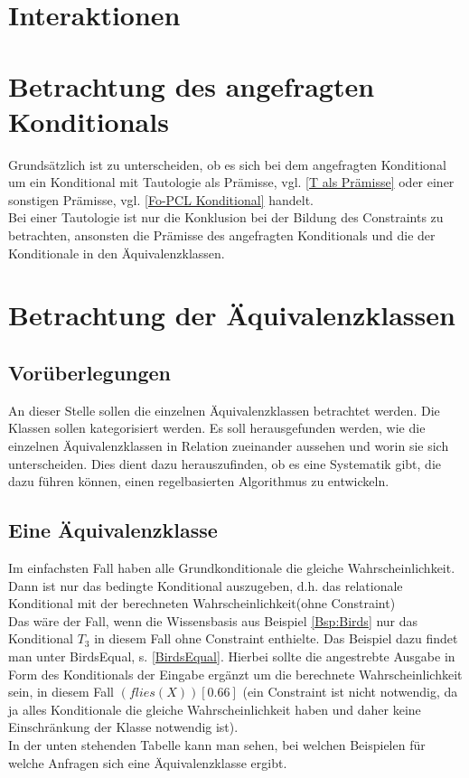 \documentclass[a4paper, 11pt]{book}
\begin{document}
\section{Interaktionen}

\section{Betrachtung des angefragten Konditionals}
Grundsätzlich ist zu unterscheiden, ob es sich bei dem angefragten Konditional um ein Konditional mit Tautologie als Prämisse, vgl. \ref{T als Prämisse} oder einer sonstigen Prämisse, vgl. \ref{Fo-PCL Konditional} handelt.\\
Bei einer Tautologie ist nur die Konklusion bei der Bildung des Constraints zu betrachten, ansonsten die Prämisse des angefragten Konditionals und die der Konditionale in den Äquivalenzklassen.


\section{Betrachtung der Äquivalenzklassen}
\subsection{Vorüberlegungen}
An dieser Stelle sollen die einzelnen Äquivalenzklassen betrachtet werden. Die Klassen sollen kategorisiert werden. Es soll herausgefunden werden, wie die einzelnen Äquivalenzklassen in Relation zueinander aussehen und worin sie sich unterscheiden. Dies dient dazu herauszufinden, ob es eine Systematik gibt, die dazu führen können, einen regelbasierten Algorithmus zu entwickeln. 
\label{Eine Äquivalenzklasse}
\subsection{Eine Äquivalenzklasse}
Im einfachsten Fall haben alle Grundkonditionale die gleiche Wahrscheinlichkeit. Dann ist nur das bedingte Konditional auszugeben, d.h. das relationale Konditional mit der berechneten Wahrscheinlichkeit(ohne Constraint)\\
Das wäre der Fall, wenn die Wissensbasis aus Beispiel \ref{Bsp:Birds} nur das Konditional $ T_3 $ in diesem Fall ohne Constraint enthielte. Das Beispiel dazu findet man unter BirdsEqual, s. \ref{BirdsEqual}. Hierbei sollte die angestrebte Ausgabe  in Form des Konditionals der Eingabe ergänzt um die berechnete Wahrscheinlichkeit sein, in diesem Fall $ (flies(X)) [0.66]$ (ein Constraint ist nicht notwendig, da ja alles Konditionale die gleiche Wahrscheinlichkeit haben und daher keine Einschränkung der Klasse notwendig ist).\\
In der unten stehenden Tabelle kann man sehen, bei welchen Beispielen für welche Anfragen sich eine Äquivalenzklasse ergibt. 
\end{document}
